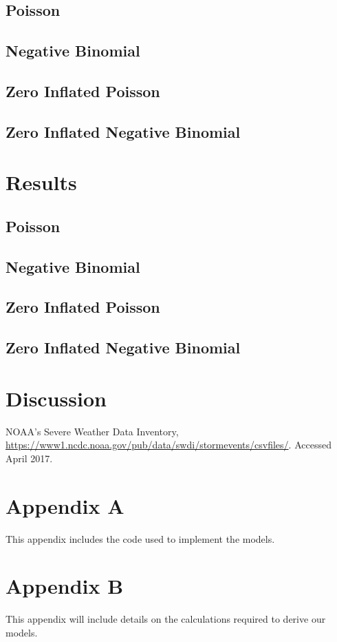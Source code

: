 \documentclass{article}
\begin{document}
\subsection{Poisson}
\label{ss:mPoisson}

\subsection{Negative Binomial}
\label{ss:mNBinom}


\subsection{Zero Inflated Poisson}
\label{ss:mZiPoisson}

\subsection{Zero Inflated Negative Binomial}
\label{ss:mZiNBinom}

\section{Results}
\label{s:results}
\subsection{Poisson}
\label{ss:rPoisson}

\subsection{Negative Binomial}
\label{ss:rNBinom}

\subsection{Zero Inflated Poisson}
\label{ss:rZiPoisson}

\subsection{Zero Inflated Negative Binomial}
\label{ss:rZiNBinom}

\section{Discussion}
\label{s:discussion}

\begin{thebibliography}{1}
   NOAA's Severe Weather Data Inventory, 
    \url{https://www1.ncdc.noaa.gov/pub/data/swdi/stormevents/csvfiles/}. 
    Accessed April 2017.
\end{thebibliography}
\clearpage
\section*{Appendix A}
This appendix includes the code used to implement the models.

\section*{Appendix B}
This appendix will include details on the calculations required to derive our models.
\end{document}
